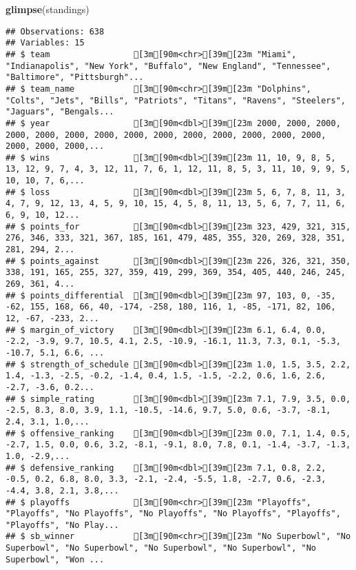 \documentclass[
]{article}
\newenvironment{Shaded}{\begin{snugshade}}{\end{snugshade}}
\newcommand{\KeywordTok}[1]{\textcolor[rgb]{0.13,0.29,0.53}{\textbf{#1}}}
\newcommand{\NormalTok}[1]{#1}
\begin{document}
\begin{Shaded}
\begin{Highlighting}[]
\KeywordTok{glimpse}\NormalTok{(standings)}
\end{Highlighting}
\end{Shaded}

\begin{verbatim}
## Observations: 638
## Variables: 15
## $ team                 [3m[90m<chr>[39m[23m "Miami", "Indianapolis", "New York", "Buffalo", "New England", "Tennessee", "Baltimore", "Pittsburgh"...
## $ team_name            [3m[90m<chr>[39m[23m "Dolphins", "Colts", "Jets", "Bills", "Patriots", "Titans", "Ravens", "Steelers", "Jaguars", "Bengals...
## $ year                 [3m[90m<dbl>[39m[23m 2000, 2000, 2000, 2000, 2000, 2000, 2000, 2000, 2000, 2000, 2000, 2000, 2000, 2000, 2000, 2000, 2000,...
## $ wins                 [3m[90m<dbl>[39m[23m 11, 10, 9, 8, 5, 13, 12, 9, 7, 4, 3, 12, 11, 7, 6, 1, 12, 11, 8, 5, 3, 11, 10, 9, 9, 5, 10, 10, 7, 6,...
## $ loss                 [3m[90m<dbl>[39m[23m 5, 6, 7, 8, 11, 3, 4, 7, 9, 12, 13, 4, 5, 9, 10, 15, 4, 5, 8, 11, 13, 5, 6, 7, 7, 11, 6, 6, 9, 10, 12...
## $ points_for           [3m[90m<dbl>[39m[23m 323, 429, 321, 315, 276, 346, 333, 321, 367, 185, 161, 479, 485, 355, 320, 269, 328, 351, 281, 294, 2...
## $ points_against       [3m[90m<dbl>[39m[23m 226, 326, 321, 350, 338, 191, 165, 255, 327, 359, 419, 299, 369, 354, 405, 440, 246, 245, 269, 361, 4...
## $ points_differential  [3m[90m<dbl>[39m[23m 97, 103, 0, -35, -62, 155, 168, 66, 40, -174, -258, 180, 116, 1, -85, -171, 82, 106, 12, -67, -233, 2...
## $ margin_of_victory    [3m[90m<dbl>[39m[23m 6.1, 6.4, 0.0, -2.2, -3.9, 9.7, 10.5, 4.1, 2.5, -10.9, -16.1, 11.3, 7.3, 0.1, -5.3, -10.7, 5.1, 6.6, ...
## $ strength_of_schedule [3m[90m<dbl>[39m[23m 1.0, 1.5, 3.5, 2.2, 1.4, -1.3, -2.5, -0.2, -1.4, 0.4, 1.5, -1.5, -2.2, 0.6, 1.6, 2.6, -2.7, -3.6, 0.2...
## $ simple_rating        [3m[90m<dbl>[39m[23m 7.1, 7.9, 3.5, 0.0, -2.5, 8.3, 8.0, 3.9, 1.1, -10.5, -14.6, 9.7, 5.0, 0.6, -3.7, -8.1, 2.4, 3.1, 1.0,...
## $ offensive_ranking    [3m[90m<dbl>[39m[23m 0.0, 7.1, 1.4, 0.5, -2.7, 1.5, 0.0, 0.6, 3.2, -8.1, -9.1, 8.0, 7.8, 0.1, -1.4, -3.7, -1.3, 1.0, -2.9,...
## $ defensive_ranking    [3m[90m<dbl>[39m[23m 7.1, 0.8, 2.2, -0.5, 0.2, 6.8, 8.0, 3.3, -2.1, -2.4, -5.5, 1.8, -2.7, 0.6, -2.3, -4.4, 3.8, 2.1, 3.8,...
## $ playoffs             [3m[90m<chr>[39m[23m "Playoffs", "Playoffs", "No Playoffs", "No Playoffs", "No Playoffs", "Playoffs", "Playoffs", "No Play...
## $ sb_winner            [3m[90m<chr>[39m[23m "No Superbowl", "No Superbowl", "No Superbowl", "No Superbowl", "No Superbowl", "No Superbowl", "Won ...
\end{verbatim}
\end{document}
